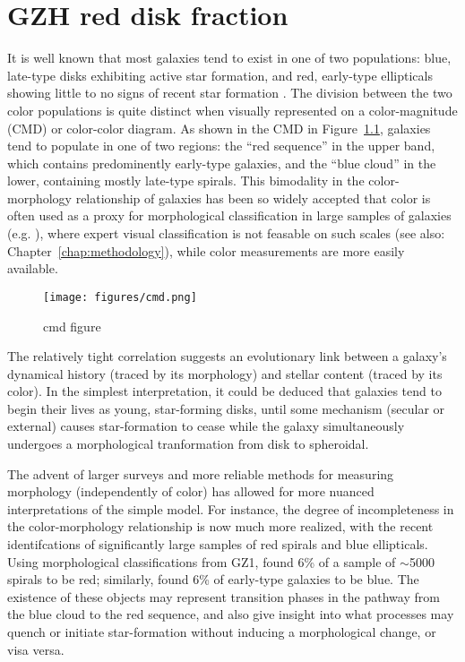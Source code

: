 
\chapter{GZH red disk fraction}
\label{chap:gzh_red_disks}

It is well known that most galaxies tend to exist in one of two populations: blue, late-type disks exhibiting active star formation, and red, early-type ellipticals showing little to no signs of recent star formation \citep{Strateva2001,Baldry2004}. The division between the two color populations is quite distinct when visually represented on a color-magnitude (CMD) or color-color diagram. As shown in the CMD in Figure~\ref{fig:CMD}, galaxies tend to populate in one of two regions: the ``red sequence'' in the upper band, which contains predominently early-type galaxies, and the ``blue cloud'' in the lower, containing mostly late-type spirals. This bimodality in the color-morphology relationship of galaxies has been so widely accepted that color is often used as a proxy for morphological classification in large samples of galaxies (e.g. \citet{Cooray2005,Lee2007,Salimbeni2008,Simon2009}), where expert visual classification is not feasable on such scales (see also: Chapter~\ref{chap:methodology}), while color measurements are more easily available. 

\begin{figure}
\centering
\texttt{[image: figures/cmd.png]}
\caption{cmd figure}
\label{fig:CMD}
\end{figure}


The relatively tight correlation suggests an evolutionary link between a galaxy's dynamical history (traced by its morphology) and stellar content (traced by its color). In the simplest interpretation, it could be deduced that galaxies tend to begin their lives as young, star-forming disks, until some mechanism (secular or external) causes star-formation to cease while the galaxy simultaneously undergoes a morphological tranformation from disk to spheroidal. 

The advent of larger surveys and more reliable methods for measuring morphology (independently of color) has allowed for more nuanced interpretations of the simple model. For instance, the degree of incompleteness in the color-morphology relationship is now much more realized, with the recent identifcations of significantly large samples of red spirals and blue ellipticals. Using morphological classifications from GZ1, \citet{Masters2010} found 6\% of a sample of $\sim$5000 spirals to be red; similarly, \citet{Schawinski2009} found 6\% of early-type galaxies to be blue. The existence of these objects may represent transition phases in the pathway from the blue cloud to the red sequence, and also give insight into what processes may quench or initiate star-formation without inducing a morphological change, or visa versa.

